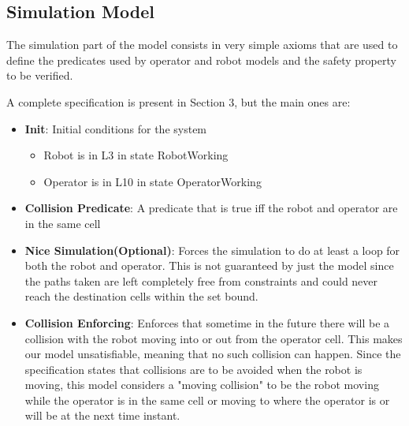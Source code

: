 
\subsection{Simulation Model}
The simulation part of the model consists in very simple axioms that are used to define the predicates used by operator and robot models and the safety property to be verified.

A complete specification is present in Section 3, but the main ones are:
\begin{itemize}
	\item \textbf{Init}: Initial conditions for the system
	\begin{itemize}
		\item Robot is in L3 in state RobotWorking
		\item Operator is in L10 in state OperatorWorking
	\end{itemize}
	
	\item \textbf{Collision Predicate}: A predicate that is true iff the robot and operator are in the same cell
	
	\item \textbf{Nice Simulation(Optional)}: Forces the simulation to do at least a loop for both the robot and operator. This is not guaranteed by just the model since the paths taken are left completely free from constraints and could never reach the destination cells within the set bound.
	
	
	\item \textbf{Collision Enforcing}: Enforces that sometime in the future there will be a collision with the robot moving into or out from the operator cell. This makes our model unsatisfiable, meaning that no such collision can happen.
	Since the specification states that collisions are to be avoided when the robot is moving, this model considers a "moving collision" to be the robot moving while the operator is in the same cell or moving to where the operator is or will be at the next time instant.
\end{itemize}

